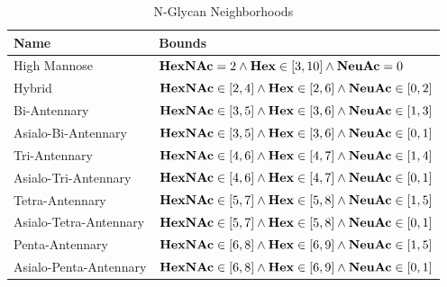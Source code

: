         \begin{table}
            \centering
            \begin{tabular}[h]{l | p{8cm}}
                Name & Bounds \\
                \hline
                High Mannose & ${\bf HexNAc} = 2 \land
                                {\bf Hex} \in [3, 10]
                                \land {\bf NeuAc} = 0$\\
                Hybrid & ${\bf HexNAc} \in [2, 4] \land
                          {\bf Hex} \in [2, 6]
                          \land {\bf NeuAc} \in [0, 2]$\\
                Bi-Antennary & ${\bf HexNAc} \in [3, 5]
                                \land {\bf Hex} \in [3, 6]
                                \land {\bf NeuAc} \in [1, 3]$\\
                Asialo-Bi-Antennary & ${\bf HexNAc} \in [3, 5]
                                \land {\bf Hex} \in [3, 6]
                                \land {\bf NeuAc} \in [0, 1]$\\
                Tri-Antennary & $
                    {\bf HexNAc} \in [4, 6]
                    \land {\bf Hex} \in [4, 7]
                    \land {\bf NeuAc} \in [1, 4]
                $\\
                Asialo-Tri-Antennary & $
                    {\bf HexNAc} \in [4, 6]
                    \land {\bf Hex} \in [4, 7]
                    \land {\bf NeuAc} \in [0, 1]
                $\\
                Tetra-Antennary & $
                    {\bf HexNAc} \in [5, 7]
                    \land {\bf Hex} \in [5, 8]
                    \land {\bf NeuAc} \in [1, 5]
                $\\
                Asialo-Tetra-Antennary & $
                    {\bf HexNAc} \in [5, 7]
                    \land {\bf Hex} \in [5, 8]
                    \land {\bf NeuAc} \in [0, 1]
                $\\
                Penta-Antennary & $
                    {\bf HexNAc} \in [6, 8]
                    \land {\bf Hex} \in [6, 9]
                    \land {\bf NeuAc} \in [1, 5]
                $\\
                Asialo-Penta-Antennary & $
                    {\bf HexNAc} \in [6, 8]
                    \land {\bf Hex} \in [6, 9]
                    \land {\bf NeuAc} \in [0, 1]
                $
            \end{tabular}
            \caption{N-Glycan Neighborhoods}
            \label{tbl:neighborhood_definitions}
        \end{table}

